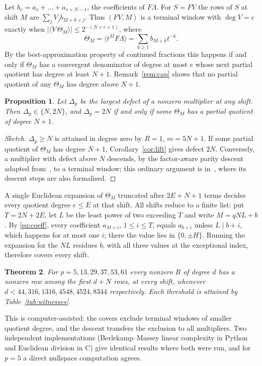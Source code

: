 \documentclass[11pt]{amsart}
\newtheorem{theorem}{Theorem}
\newtheorem{proposition}[theorem]{Proposition}
\theoremstyle{definition}
\theoremstyle{remark}
\newcommand{\abs}[1]{\left|#1\right|}
\newcommand{\frp}[1]{\langle #1\rangle}
\begin{document}
Let $b_v=a_v+\dots+a_{v+N-1}$, the coefficients of $F\Lambda$. For $S=FV$ the
rows of $S$ at shift $M$ are $\sum_jV_jb_{M+k+j}$. Thus $(FV,M)$ is a terminal
window with $\deg V=e$ exactly when
$\abs{\frp{V\,\Theta_M}}\le2^{-(N+e+1)}$, where
\[
\Theta_M=\frp{t^MF\Lambda}=\sum_{k\ge1}b_{M+k}t^{-k}.
\]
By the best-approximation property of continued fractions this happens if and
only if $\Theta_M$ has a convergent denominator of degree at most $e$ whose next
partial quotient has degree at least $N+1$. Remark~\ref{rem:cap} shows that
no partial quotient of any $\Theta_M$ has degree above $N+1$.

\begin{proposition}\label{prop:cf}
Let $\Delta_p$ be the largest defect of a nonzero multiplier at any shift.
Then $\Delta_p\in\{N,2N\}$, and $\Delta_p=2N$ if and only if some
$\Theta_M$ has a partial quotient of degree $N+1$.
\end{proposition}

\begin{proof}[Sketch]
$\Delta_p\ge N$ is attained in degree zero by $R=1$, $m=5N+1$. If some
partial quotient of $\Theta_M$ has degree $N+1$, Corollary~\ref{cor:lift}
gives defect $2N$. Conversely, a multiplier with defect above $N$ descends, by
the factor-aware parity descent adapted from~\cite[\S3]{LS}, to a terminal
window; this ordinary argument is in~\cite{repo}, where its descent steps are
also formalised.
\end{proof}

A single Euclidean expansion of $\Theta_M$ truncated after $2E+N+1$ terms
decides every quotient degree $e\le E$ at that shift. All shifts reduce to a
finite list: put $T=2N+2E$, let $L$ be the least power of two exceeding $T$
and write $M=qNL+b$. By \eqref{eq:coeff}, every coefficient $a_{M+i}$,
$1\le i\le T$, equals $a_{b+i}$ unless $L\mid b+i$, which happens for at
most one $i$; there the value lies in $\{0,\pm H\}$. Running the expansion
for the $NL$ residues $b$, with all three values at the exceptional index,
therefore covers every shift.

\begin{theorem}\label{thm:minimal}
For $p=5,13,29,37,53,61$ every nonzero $R$ of degree $d$ has a nonzero row
among the first $d+N$ rows, at every shift, whenever
$d<44,316,1316,4548,4524,8344$ respectively. Each threshold is attained by Table~\ref{tab:witnesses}.
\end{theorem}

This is computer-assisted: the covers exclude terminal windows of smaller
quotient degree, and the descent transfers the exclusion to all multipliers.
Two independent implementations (Berlekamp--Massey linear complexity in Python
and Euclidean division in C) give identical results where both were run, and
for $p=5$ a direct nullspace computation agrees.
\end{document}
